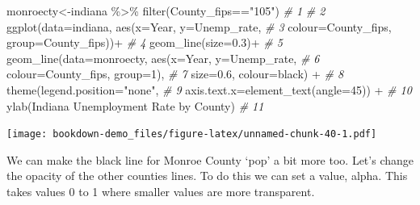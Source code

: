 \documentclass[
]{book}
\newenvironment{Shaded}{\begin{snugshade}}{\end{snugshade}}
\newcommand{\AttributeTok}[1]{\textcolor[rgb]{0.77,0.63,0.00}{#1}}
\newcommand{\CommentTok}[1]{\textcolor[rgb]{0.56,0.35,0.01}{\textit{#1}}}
\newcommand{\DecValTok}[1]{\textcolor[rgb]{0.00,0.00,0.81}{#1}}
\newcommand{\FloatTok}[1]{\textcolor[rgb]{0.00,0.00,0.81}{#1}}
\newcommand{\FunctionTok}[1]{\textcolor[rgb]{0.00,0.00,0.00}{#1}}
\newcommand{\NormalTok}[1]{#1}
\newcommand{\OtherTok}[1]{\textcolor[rgb]{0.56,0.35,0.01}{#1}}
\newcommand{\SpecialCharTok}[1]{\textcolor[rgb]{0.00,0.00,0.00}{#1}}
\newcommand{\StringTok}[1]{\textcolor[rgb]{0.31,0.60,0.02}{#1}}
\begin{document}
\begin{Shaded}
\begin{Highlighting}[]
\NormalTok{monroecty}\OtherTok{\textless{}{-}}\NormalTok{indiana }\SpecialCharTok{\%\textgreater{}\%} \FunctionTok{filter}\NormalTok{(County\_fips}\SpecialCharTok{==}\StringTok{"105"}\NormalTok{)       }\CommentTok{\# 1}
                                                        \CommentTok{\# 2}
\FunctionTok{ggplot}\NormalTok{(}\AttributeTok{data=}\NormalTok{indiana, }\FunctionTok{aes}\NormalTok{(}\AttributeTok{x=}\NormalTok{Year, }\AttributeTok{y=}\NormalTok{Unemp\_rate,          }\CommentTok{\# 3}
    \AttributeTok{colour=}\NormalTok{County\_fips, }\AttributeTok{group=}\NormalTok{County\_fips))}\SpecialCharTok{+}            \CommentTok{\# 4}
  \FunctionTok{geom\_line}\NormalTok{(}\AttributeTok{size=}\FloatTok{0.3}\NormalTok{)}\SpecialCharTok{+}                                  \CommentTok{\# 5}
  \FunctionTok{geom\_line}\NormalTok{(}\AttributeTok{data=}\NormalTok{monroecty, }\FunctionTok{aes}\NormalTok{(}\AttributeTok{x=}\NormalTok{Year, }\AttributeTok{y=}\NormalTok{Unemp\_rate,   }\CommentTok{\# 6}
    \AttributeTok{colour=}\NormalTok{County\_fips, }\AttributeTok{group=}\DecValTok{1}\NormalTok{),                       }\CommentTok{\# 7}
    \AttributeTok{size=}\FloatTok{0.6}\NormalTok{, }\AttributeTok{colour=}\StringTok{\textquotesingle{}black\textquotesingle{}}\NormalTok{) }\SpecialCharTok{+}                         \CommentTok{\# 8}
  \FunctionTok{theme}\NormalTok{(}\AttributeTok{legend.position=}\StringTok{"none"}\NormalTok{,                         }\CommentTok{\# 9}
    \AttributeTok{axis.text.x=}\FunctionTok{element\_text}\NormalTok{(}\AttributeTok{angle=}\DecValTok{45}\NormalTok{)) }\SpecialCharTok{+}              \CommentTok{\# 10}
  \FunctionTok{ylab}\NormalTok{(}\StringTok{\textquotesingle{}Indiana Unemployment Rate by County\textquotesingle{}}\NormalTok{)          }\CommentTok{\# 11}
\end{Highlighting}
\end{Shaded}

\texttt{[image: bookdown-demo\_files/figure-latex/unnamed-chunk-40-1.pdf]}

We can make the black line for Monroe County `pop' a bit more too. Let's change the opacity of the other counties lines. To do this we can set a value, alpha. This takes values 0 to 1 where smaller values are more transparent.
\end{document}
